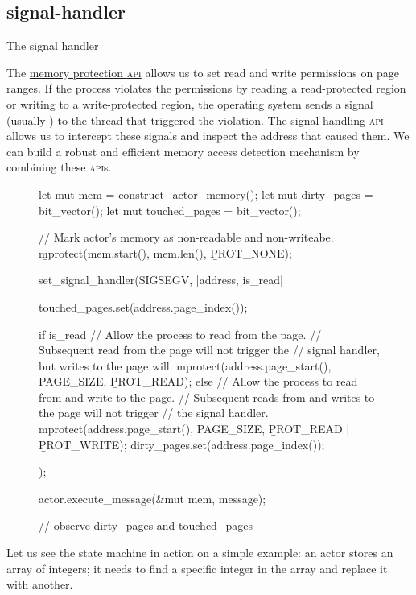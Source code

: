 \documentclass{article}
\begin{document}
\subsection{signal-handler}{The signal handler}

The \href{https://man7.org/linux/man-pages/man2/mprotect.2.html}{memory protection \textsc{api}} allows us to set read and write permissions on page ranges.
If the process violates the permissions by reading a read-protected region or writing to a write-protected region, the operating system sends a signal (usually ) to the thread that triggered the violation.
The \href{https://man7.org/linux/man-pages/man7/signal.7.html}{signal handling \textsc{api}} allows us to intercept these signals and inspect the address that caused them.
We can build a robust and efficient memory access detection mechanism by combining these \textsc{api}s.

\begin{figure}
\begin{code}[rust]
let mut mem = construct_actor_memory();
let mut dirty_pages = bit_vector();
let mut touched_pages = bit_vector();

// Mark actor's memory as non-readable and non-writeabe.
\b{mprotect}(mem.start(), mem.len(), \b{PROT_NONE});

set_signal_handler(SIGSEGV, |address, is_read| {
  touched_pages.set(address.page_index());

  if is_read {
    // Allow the process to read from the page.
    // Subsequent read from the page will not trigger the
    // signal handler, but writes to the page will.
    mprotect(address.page_start(), PAGE_SIZE, \b{PROT_READ});
  } else {
    // Allow the process to read from and write to the page.
    // Subsequent reads from and writes to the page will not trigger
    // the signal handler.
    mprotect(address.page_start(), PAGE_SIZE, \b{PROT_READ} | \b{PROT_WRITE});
    dirty_pages.set(address.page_index());
  }
});

actor.execute_message(&mut mem, message);

// observe dirty_pages and touched_pages
\end{code}
\end{figure}

Let us see the state machine in action on a simple example:
an actor stores an array of integers; it needs to find a specific integer in the array and replace it with another.
\end{document}
